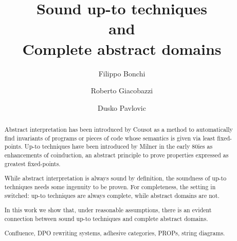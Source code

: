 \documentclass{llncs}
\begin{document}
\title{Sound up-to techniques \\and \\Complete abstract domains}
\author{Filippo Bonchi  \and Roberto Giacobazzi\and Dusko Pavlovic  }

\maketitle



\begin{abstract}
Abstract interpretation has been introduced by Cousot as a method to automatically find invariants of programs or pieces of code whose semantics is given via least fixed-points.
Up-to techniques have been introduced by Milner in the early 80ies as enhancements of coinduction, an abstract principle to prove properties expressed as greatest fixed-points. 

While abstract interpretation is always sound by definition, the soundness of up-to techniques needs some ingenuity to be proven. For completeness, the setting in switched: up-to techniques are always complete, while abstract domains are not. 

In this work we show that, under reasonable assumptions, there is an evident connection between sound up-to techniques and complete abstract domains.


\begin{keywords}
Confluence, DPO rewriting systems, adhesive categories, PROPs, string diagrams.
\end{keywords}
\end{abstract}



%
%
%
%
\end{document}
